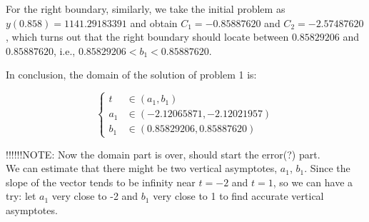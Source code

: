 \documentclass[a4paper]{article}
\begin{document}
	For the right boundary, similarly, we take the initial problem as $y(0.858) = 1141.29183391$ and obtain $C_1 = -0.85887620$ and $C_2 = -2.57487620$, which turns out that the right boundary should locate between $0.85829206$ and $0.85887620$, i.e., $0.85829206 < b_1 < 0.85887620$. 
	
	In conclusion, the domain of the solution of problem 1 is:
	
	$$
	\left\{
	\begin{aligned}
		t &\in (a_1, b_1) \nonumber \\
		a_1 &\in (-2.12065871, -2.12021957) \nonumber \\
		b_1 &\in (0.85829206, 0.85887620) \nonumber
	\end{aligned}
	\right.
	$$
	
	
	!!!!!!NOTE: Now the domain part is over, should start the error(?) part. \\
	
	We can estimate that there might be two vertical asymptotes, $a_1$, $b_1$. Since the slope of the vector tends to be infinity near $t=-2$ and $t=1$, so we can have a try: let $a_1$ very close to -2 and $b_1$ very close to 1 to find accurate vertical asymptotes.
	
\end{document}
